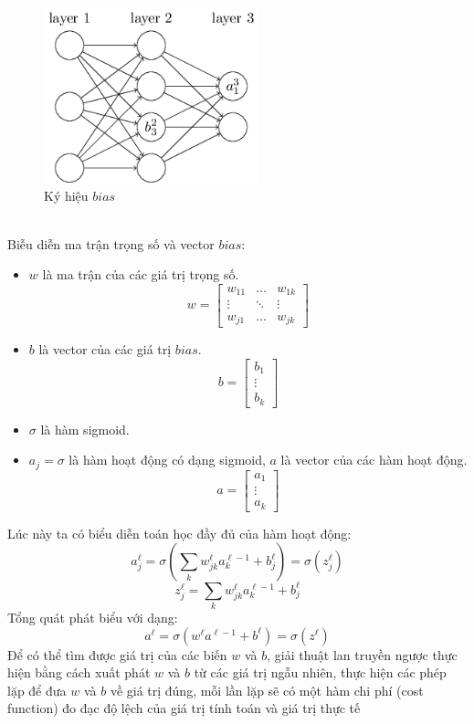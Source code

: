 \begin{figure}[h!]
\centering
\includegraphics[height=2in, keepaspectratio=true]{exb.png}
\caption{Ký hiệu $bias$}
\end{figure}\\
Biễu diễn ma trận trọng số và vector $bias$:
\begin{itemize}
\item $w$ là ma trận của các giá trị trọng số.
\[ w =
\begin{bmatrix}
w_{11} & \ldots & w_{1k} \\
\vdots & \ddots & \vdots\\
w_{j1} & \ldots & w_{jk}
\end{bmatrix}
\]
\item $b$ là vector của các giá trị $bias$.
\[ b =
\begin{bmatrix}
b_1\\
\vdots\\
b_k
\end{bmatrix}
\]
\item $\sigma$ là hàm sigmoid.
\item $a_j=\sigma$ là hàm hoạt động có dạng sigmoid, $a$ là vector của các hàm 
hoạt động.
\[ a =
\begin{bmatrix}
a_1\\
\vdots\\
a_k
\end{bmatrix}
\]
\end{itemize}
Lúc này ta có biểu diễn toán học đầy đủ của hàm hoạt động:
\[
  a_j^\ell=\sigma(\sum_k w_{jk}^\ell a_k^{\ell-1} + b_j^\ell)=\sigma(z _j^\ell)
\]
\[
  z _j^\ell=\sum_k w_{jk}^\ell a_k^{\ell-1} + b_j^\ell
\]
Tổng quát phát biểu với dạng:\\
\[
  a^\ell=\sigma(w^\ell a^{\ell-1} + b^\ell)=\sigma(z^\ell)
\]
Để có thể tìm được giá trị của các biến $w$ và $b$, giải thuật lan truyền ngược 
thực hiện bằng cách xuất phát $w$ và $b$ từ các giá trị ngẫu nhiên, thực hiện 
các phép lặp để đưa $w$ và $b$ về giá trị đúng, mỗi lần lặp sẽ có một hàm chi 
phí (cost function) đo đạc độ lệch của giá trị tính toán và giá trị thực tế 
